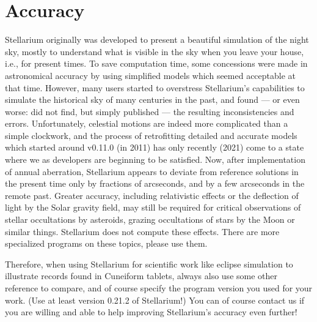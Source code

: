 

\chapter{Accuracy}
\label{ch:Accuracy}

Stellarium originally was developed to present a beautiful simulation
of the night sky, mostly to understand what is visible in the sky when
you leave your house, i.e., for present times. To save computation
time, some concessions were made in astronomical accuracy by using
simplified models which seemed acceptable at that time. However, many
users started to overstress Stellarium's capabilities to simulate the
historical sky of many centuries in the past, and found --- or even
worse: did not find, but simply published --- the resulting
inconsistencies and errors.  Unfortunately, celestial motions are
indeed more complicated than a simple clockwork, and the process of
retrofitting detailed and accurate models which started around v0.11.0
(in 2011) has only recently (2021)  come to a
state where we as developers are beginning to be satisfied. Now, after
implementation of annual aberration, Stellarium appears to deviate
from reference solutions in the present time only by fractions of
arcseconds, and by a few arcseconds in the remote past.  Greater
accuracy, including relativistic effects or the deflection of light by
the Solar gravity field, may still be required for critical
observations of stellar occultations by asteroids, grazing
occultations of stars by the Moon or similar things. Stellarium does
not compute these effects. There are more specialized programs on
these topics, please use them.

Therefore, when using Stellarium for scientific work like eclipse
simulation to illustrate records found in Cuneiform tablets, always
also use some other reference to compare, and of course specify the
program version you used for your work. (Use at least version 0.21.2
of Stellarium!)  You can of course contact us if you are willing and
able to help improving Stellarium's accuracy even further!

